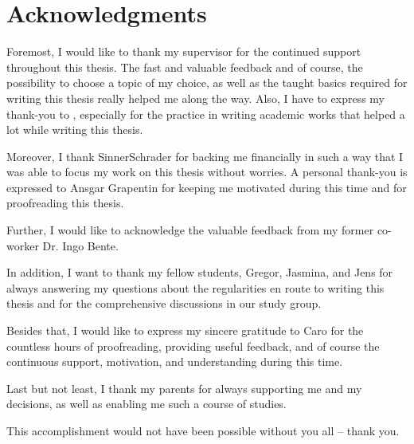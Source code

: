 \chapter*{Acknowledgments}
\thispagestyle{noheader}

Foremost, I would like to thank my supervisor \firstTutor{} for the continued support throughout this thesis. The fast and valuable feedback and of course, the possibility to choose a topic of my choice, as well as the taught basics required for writing this thesis really helped me along the way. Also, I have to express my thank-you to \secondTutor, especially for the practice in writing academic works that helped a lot while writing this thesis.

Moreover, I thank SinnerSchrader for backing me financially in such a way that I was able to focus my work on this thesis without worries. A personal thank-you is expressed to Ansgar Grapentin for keeping me motivated during this time and for proofreading this thesis.

Further, I would like to acknowledge the valuable feedback from my former co-worker Dr. Ingo Bente.

In addition, I want to thank my fellow students, Gregor, Jasmina, and Jens for always answering my questions about the regularities en route to writing this thesis and for the comprehensive discussions in our study group.

Besides that, I would like to express my sincere gratitude to Caro for the countless hours of proofreading, providing useful feedback, and of course the continuous support, motivation, and understanding during this time.

Last but not least, I thank my parents for always supporting me and my decisions, as well as enabling me such a course of studies.

This accomplishment would not have been possible without you all -- thank you.

\newpage